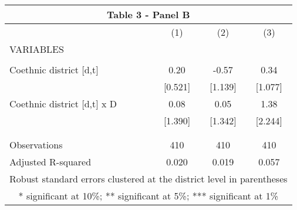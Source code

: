 \begin{tabular}{lccc}
\multicolumn{4}{c}{Table 3 - Panel B} \\ \hline
 & (1) & (2) & (3) \\
VARIABLES &  &  &  \\ \hline
 &  &  &  \\
Coethnic district [d,t] & 0.20 & -0.57 & 0.34 \\
 & [0.521] & [1.139] & [1.077] \\
Coethnic district [d,t] x D & 0.08 & 0.05 & 1.38 \\
 & [1.390] & [1.342] & [2.244] \\
 &  &  &  \\
 &  &  &  \\
Observations & 410 & 410 & 410 \\
 Adjusted R-squared & 0.020 & 0.019 & 0.057 \\ \hline
\multicolumn{4}{c}{ Robust standard errors clustered at the district level in parentheses} \\
\multicolumn{4}{c}{ * significant at 10\%; ** significant at 5\%; *** significant at 1\%} \\
\end{tabular}
